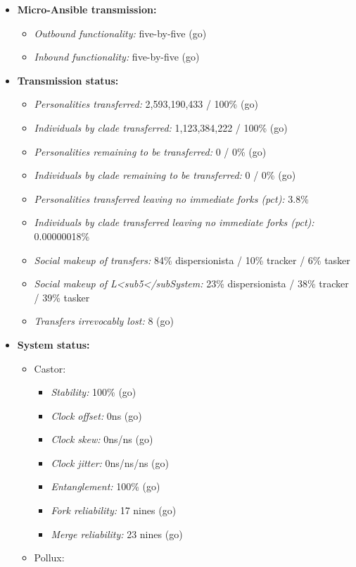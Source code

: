 \begin{itemize}
\tightlist
\item
  \textbf{Micro-Ansible transmission:}

  \begin{itemize}
  \tightlist
  \item
    \emph{Outbound functionality:} five-by-five (go)
  \item
    \emph{Inbound functionality:} five-by-five (go)
  \end{itemize}
\item
  \textbf{Transmission status:}

  \begin{itemize}
  \tightlist
  \item
    \emph{Personalities transferred:} 2,593,190,433 / 100\% (go)
  \item
    \emph{Individuals by clade transferred:} 1,123,384,222 / 100\% (go)
  \item
    \emph{Personalities remaining to be transferred:} 0 / 0\% (go)
  \item
    \emph{Individuals by clade remaining to be transferred:} 0 / 0\% (go)
  \item
    \emph{Personalities transferred leaving no immediate forks (pct):} 3.8\%
  \item
    \emph{Individuals by clade transferred leaving no immediate forks (pct):} 0.00000018\%
  \item
    \emph{Social makeup of transfers:} 84\% dispersionista / 10\% tracker / 6\% tasker
  \item
    \emph{Social makeup of L\textless sub5\textless/subSystem:} 23\% dispersionista / 38\% tracker / 39\% tasker
  \item
    \emph{Transfers irrevocably lost:} 8 (go)
  \end{itemize}
\item
  \textbf{System status:}

  \begin{itemize}
  \tightlist
  \item
    Castor:

    \begin{itemize}
    \tightlist
    \item
      \emph{Stability:} 100\% (go)
    \item
      \emph{Clock offset:} 0ns (go)
    \item
      \emph{Clock skew:} 0ns/ns (go)
    \item
      \emph{Clock jitter:} 0ns/ns/ns (go)
    \item
      \emph{Entanglement:} 100\% (go)
    \item
      \emph{Fork reliability:} 17 nines (go)
    \item
      \emph{Merge reliability:} 23 nines (go)
    \end{itemize}
  \item
    Pollux:


\end{itemize}
\end{itemize}
